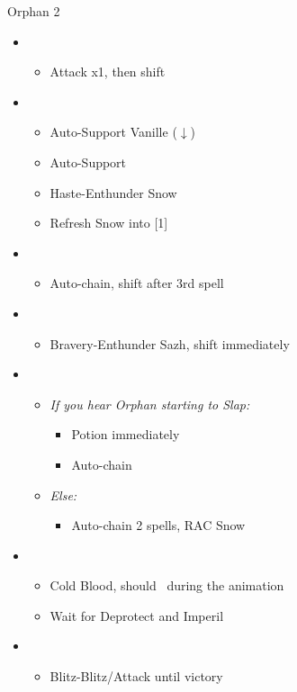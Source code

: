 \begin{battle}{Orphan 2}
	\begin{itemize}
		\item \second
			\begin{itemize}
				\item Attack x1, then shift
			\end{itemize}
		\item \fifth
			\begin{itemize}
				\item Auto-Support Vanille ($\downarrow$)
				\item Auto-Support
				\item Haste-Enthunder Snow
				\item Refresh Snow into [1]
			\end{itemize}
		\item \first
			\begin{itemize}
				\item Auto-chain, shift after 3rd spell
			\end{itemize}
		\item \fifth
			\begin{itemize}
				\item Bravery-Enthunder Sazh, shift immediately
			\end{itemize}
		\item \first
			\begin{itemize}
				\item \textit{If you hear Orphan starting to Slap:}
					\begin{itemize}
						\item Potion immediately
						\item Auto-chain
					\end{itemize}
				\item \textit{Else:}
					\begin{itemize}
						\item Auto-chain 2 spells, RAC Snow
					\end{itemize}
			\end{itemize}
		\item \third
			\begin{itemize}
				\item Cold Blood, should \stagger~during the animation
				\item Wait for Deprotect and Imperil
			\end{itemize}
		\item \sixth
			\begin{itemize}
				\item Blitz-Blitz/Attack until victory
			\end{itemize}
	\end{itemize}
\end{battle}